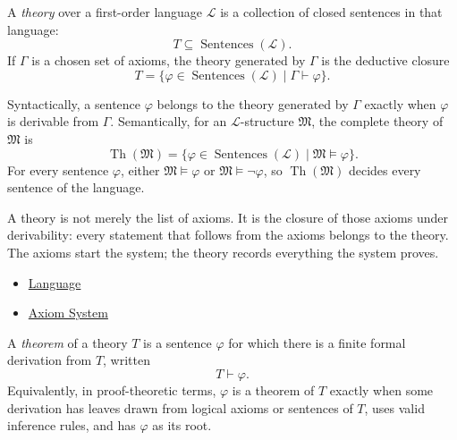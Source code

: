 \begin{definition}[Theory]
\label{def:axiom-systems-theory}
A \emph{theory} over a first-order language $\mathcal{L}$ is a collection of
closed sentences in that language:
\[
  T\subseteq\operatorname{Sentences}(\mathcal{L}).
\]
If $\Gamma$ is a chosen set of axioms, the theory generated by $\Gamma$ is the
deductive closure
\[
  T=\{\varphi\in\operatorname{Sentences}(\mathcal{L})\mid
      \Gamma\vdash\varphi\}.
\]
\end{definition}

\begin{remark*}
Syntactically, a sentence $\varphi$ belongs to the theory generated by
$\Gamma$ exactly when $\varphi$ is derivable from $\Gamma$. Semantically, for
an $\mathcal{L}$-structure $\mathfrak{M}$, the complete theory of
$\mathfrak{M}$ is
\[
  \operatorname{Th}(\mathfrak{M})
  =\{\varphi\in\operatorname{Sentences}(\mathcal{L})\mid
      \mathfrak{M}\vDash\varphi\}.
\]
For every sentence $\varphi$, either $\mathfrak{M}\vDash\varphi$ or
$\mathfrak{M}\vDash\neg\varphi$, so $\operatorname{Th}(\mathfrak{M})$
decides every sentence of the language.
\end{remark*}

\begin{remark*}[Interpretation]
A theory is not merely the list of axioms. It is the closure of those axioms
under derivability: every statement that follows from the axioms belongs to
the theory. The axioms start the system; the theory records everything the
system proves.
\end{remark*}

\begin{dependencies}
\begin{itemize}
  \item \hyperref[def:language]{Language}
  \item \hyperref[def:axiom-system]{Axiom System}
\end{itemize}
\end{dependencies}

\begin{definition}[Theorem]
\label{def:axiom-systems-theorem}
A \emph{theorem} of a theory $T$ is a sentence $\varphi$ for which there is a
finite formal derivation from $T$, written
\[
  T\vdash\varphi.
\]
Equivalently, in proof-theoretic terms, $\varphi$ is a theorem of $T$ exactly
when some derivation has leaves drawn from logical axioms or sentences of
$T$, uses valid inference rules, and has $\varphi$ as its root.
\end{definition}

